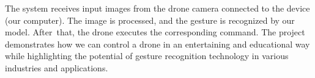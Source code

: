  The system receives input images from the drone camera connected to the device (our computer). The image is processed, and the gesture is recognized by our model. After~that, the drone executes the corresponding command. 
 The project demonstrates how we can control a drone in an entertaining and educational way while highlighting the potential of gesture recognition technology in various industries and applications.
